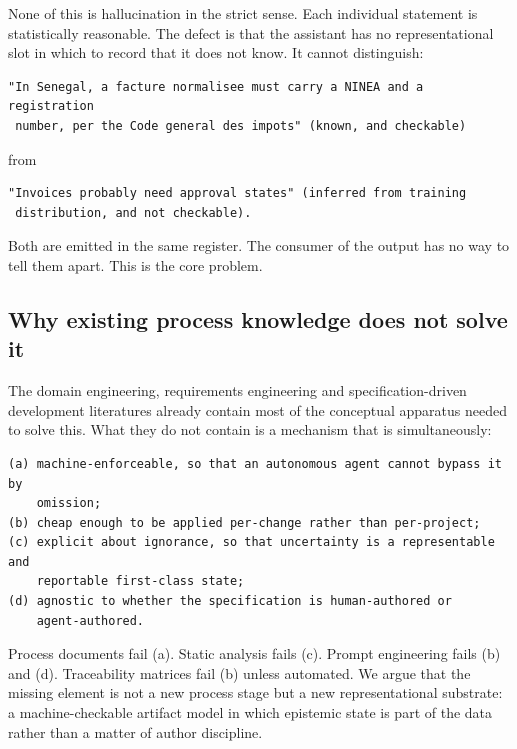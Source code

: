 \documentclass[11pt,a4paper]{article}
\begin{document}
None of this is hallucination in the strict sense. Each individual statement is statistically reasonable. The defect is that the assistant has no representational slot in which to record that it does not know. It cannot distinguish:

\begin{Verbatim}[fontsize=\footnotesize,breaklines=true,breakanywhere=true,breakautoindent=false,samepage=false]
"In Senegal, a facture normalisee must carry a NINEA and a registration
 number, per the Code general des impots" (known, and checkable)
\end{Verbatim}

from

\begin{Verbatim}[fontsize=\footnotesize,breaklines=true,breakanywhere=true,breakautoindent=false,samepage=false]
"Invoices probably need approval states" (inferred from training
 distribution, and not checkable).
\end{Verbatim}

Both are emitted in the same register. The consumer of the output has no way to tell them apart. This is the core problem.

\subsection{Why existing process knowledge does not solve it}

The domain engineering, requirements engineering and specification-driven development literatures already contain most of the conceptual apparatus needed to solve this. What they do not contain is a mechanism that is simultaneously:

\begin{Verbatim}[fontsize=\footnotesize,breaklines=true,breakanywhere=true,breakautoindent=false,samepage=false]
(a) machine-enforceable, so that an autonomous agent cannot bypass it by
    omission;
(b) cheap enough to be applied per-change rather than per-project;
(c) explicit about ignorance, so that uncertainty is a representable and
    reportable first-class state;
(d) agnostic to whether the specification is human-authored or
    agent-authored.
\end{Verbatim}

Process documents fail (a). Static analysis fails (c). Prompt engineering fails (b) and (d). Traceability matrices fail (b) unless automated. We argue that the missing element is not a new process stage but a new representational substrate: a machine-checkable artifact model in which epistemic state is part of the data rather than a matter of author discipline.
\end{document}
